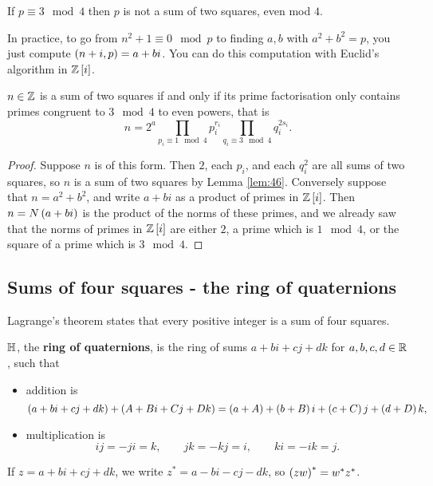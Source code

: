 \begin{remark2}
If $ p \equiv 3 \mod 4 $ then $ p $ is not a sum of two squares, even mod $ 4 $.
\end{remark2}

\begin{remark2}
In practice, to go from $ n^2 + 1 \equiv 0 \mod p $ to finding $ a, b $ with $ a^2 + b^2 = p $, you just compute $ \left( n + i, p \right) = a + bi $. You can do this computation with Euclid's algorithm in $ \mathbb{Z}\left[ i \right] $.
\end{remark2}

\begin{theorem}
$ n \in \mathbb{Z} $ is a sum of two squares if and only if its prime factorisation only contains primes congruent to $ 3 \mod 4 $ to even powers, that is
$$ n = 2^a\prod_{p_i \equiv 1 \mod 4} p_i^{r_i}\prod_{q_i \equiv 3 \mod 4} q_i^{2s_i}. $$
\end{theorem}

\begin{proof}
Suppose $ n $ is of this form. Then $ 2 $, each $ p_i $, and each $ q_i^2 $ are all sums of two squares, so $ n $ is a sum of two squares by Lemma \ref{lem:46}. Conversely suppose that $ n = a^2 + b^2 $, and write $ a + bi $ as a product of primes in $ \mathbb{Z}\left[ i \right] $. Then $ n = N\left( a + bi \right) $ is the product of the norms of these primes, and we already saw that the norms of primes in $ \mathbb{Z}\left[ i \right] $ are either $ 2 $, a prime which is $ 1 \mod 4 $, or the square of a prime which is $ 3 \mod 4 $.
\end{proof}

\subsection{Sums of four squares - the ring of quaternions}

Lagrange's theorem states that every positive integer is a sum of four squares.

\begin{definition}
$ \mathbb{H} $, the \textbf{ring of quaternions}, is the ring of sums $ a + bi + cj + dk $ for $ a, b, c, d \in \mathbb{R} $, such that
\begin{itemize}
\item addition is
$$ \left( a + bi + cj + dk \right) + \left( A + Bi + Cj + Dk \right) = \left( a + A \right) + \left( b + B \right)i + \left( c + C \right)j + \left( d + D \right)k, $$
\item multiplication is
$$ ij = -ji = k, \qquad jk = -kj = i, \qquad ki = -ik = j. $$
\end{itemize}
If $ z = a + bi + cj + dk $, we write $ z^* = a - bi - cj - dk $, so $ \left( zw \right)^* = w^*z^* $.
\end{definition}

